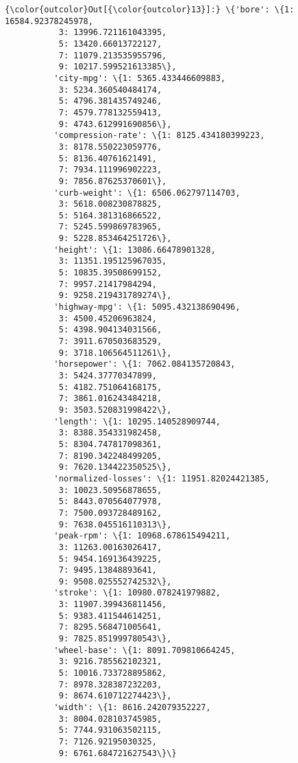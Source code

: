 \documentclass[11pt]{article}
\begin{document}
\begin{Verbatim}[commandchars=\\\{\}]
{\color{outcolor}Out[{\color{outcolor}13}]:} \{'bore': \{1: 16584.92378245978,
           3: 13996.721161043395,
           5: 13420.66013722127,
           7: 11079.213535955796,
           9: 10217.599521613385\},
          'city-mpg': \{1: 5365.433446609883,
           3: 5234.360540484174,
           5: 4796.381435749246,
           7: 4579.778132559413,
           9: 4743.612991690856\},
          'compression-rate': \{1: 8125.434180399223,
           3: 8178.550223059776,
           5: 8136.40761621491,
           7: 7934.111996902223,
           9: 7856.87625370601\},
          'curb-weight': \{1: 6506.062797114703,
           3: 5618.008230878825,
           5: 5164.381316866522,
           7: 5245.599869783965,
           9: 5228.853464251726\},
          'height': \{1: 13086.66478901328,
           3: 11351.195125967035,
           5: 10835.39508699152,
           7: 9957.21417984294,
           9: 9258.219431789274\},
          'highway-mpg': \{1: 5095.432138690496,
           3: 4500.45206963824,
           5: 4398.904134031566,
           7: 3911.670503683529,
           9: 3718.106564511261\},
          'horsepower': \{1: 7062.084135720843,
           3: 5424.37770347899,
           5: 4182.751064168175,
           7: 3861.016243484218,
           9: 3503.520831998422\},
          'length': \{1: 10295.140528909744,
           3: 8388.354331982458,
           5: 8304.747817098361,
           7: 8190.342248499205,
           9: 7620.134422350525\},
          'normalized-losses': \{1: 11951.82024421385,
           3: 10023.50956878655,
           5: 8443.070564077978,
           7: 7500.093728489162,
           9: 7638.045516110313\},
          'peak-rpm': \{1: 10968.678615494211,
           3: 11263.00163026417,
           5: 9454.169136439225,
           7: 9495.13848893641,
           9: 9508.025552742532\},
          'stroke': \{1: 10980.078241979882,
           3: 11907.399436811456,
           5: 9383.411544614251,
           7: 8295.568471005641,
           9: 7825.851999780543\},
          'wheel-base': \{1: 8091.709810664245,
           3: 9216.785562102321,
           5: 10016.733728895862,
           7: 8978.328387232203,
           9: 8674.610712274423\},
          'width': \{1: 8616.242079352227,
           3: 8004.028103745985,
           5: 7744.931063502115,
           7: 7126.92195030325,
           9: 6761.684721627543\}\}
\end{Verbatim}
            
\end{document}
